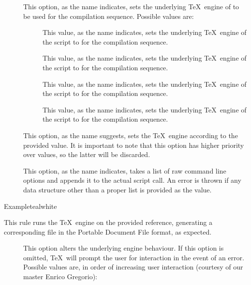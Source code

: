 \begin{description}
\begin{description}
\item[] This option, as the name indicates, sets the underlying \TeX\ engine of  to be used for the compilation sequence. Possible values are:

\begin{description}
\item[] This value, as the name indicates, sets the underlying \TeX\ engine of the script to  for the compilation sequence.

\item[] This value, as the name indicates, sets the underlying \TeX\ engine of the script to  for the compilation sequence.

\item[] This value, as the name indicates, sets the underlying \TeX\ engine of the script to  for the compilation sequence.

\item[] This value, as the name indicates, sets the underlying \TeX\ engine of the script to  for the compilation sequence.
\end{description}

\item[] This option, as the name suggests, sets the \TeX\ engine according to the provided value. It is important to note that this option has higher priority over  values, so the latter will be discarded.

\item[] This option, as the name indicates, takes a list of raw command line options and appends it to the actual script call. An error is thrown if any data structure other than a proper list is provided as the value.
\end{description}

\begin{codebox}{Example}{teal}{\icnote}{white}
\end{codebox}

\item[\rulebox{luahbtex}]
This rule runs the  \TeX\ engine on the provided  reference, generating a corresponding file in the Portable Document File format, as expected.

\begin{description}
\item[] This option alters the underlying engine behaviour. If this option is omitted, \TeX\ will prompt the user for interaction in the event of an error. Possible values are, in order of increasing user interaction (courtesy of our master Enrico Gregorio):


\end{description}
\end{description}
